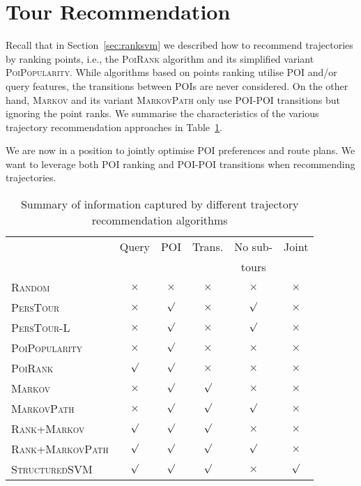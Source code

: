 \section{Tour Recommendation}
\label{sec:recommendation}


Recall that in Section~\ref{sec:ranksvm} we described how to recommend trajectories by ranking points,
i.e., the \textsc{PoiRank} algorithm and its simplified variant \textsc{PoiPopularity}.
While algorithms based on points ranking utilise POI and/or query features, 
the transitions between POIs are never considered.
On the other hand, \textsc{Markov} and its variant \textsc{MarkovPath}
only use POI-POI transitions but ignoring the point ranks.
We summarise the characteristics of the various trajectory recommendation approaches in Table~\ref{tab:algsummary}.

We are now in a position to jointly optimise POI preferences and route plans.
We want to leverage both POI ranking and POI-POI transitions when recommending trajectories.


\begin{table}[t]
\caption{Summary of information captured by different trajectory recommendation algorithms}
\label{tab:algsummary}
\centering
\setlength{\tabcolsep}{3pt} %
\begin{tabular}{l|*{5}{c}} \hline
                                & Query    & POI      & Trans.     & No sub-      & Joint    \\
                                &          &          &            & tours        &          \\ \hline
\textsc{Random}                 & $\times$ & $\times$ & $\times$   & $\times$     & $\times$ \\
\textsc{PersTour}\cite{ijcai15} & $\times$ & $\surd$  & $\times$   & $\surd$      & $\times$ \\
\textsc{PersTour-L}             & $\times$ & $\surd$  & $\times$   & $\surd$      & $\times$ \\
\textsc{PoiPopularity}          & $\times$ & $\surd$  & $\times$   & $\times$     & $\times$ \\
\textsc{PoiRank}                & $\surd$  & $\surd$  & $\times$   & $\times$     & $\times$ \\
\textsc{Markov}                 & $\times$ & $\surd$  & $\surd$    & $\times$     & $\times$ \\
\textsc{MarkovPath}             & $\times$ & $\surd$  & $\surd$    & $\surd$      & $\times$ \\
\textsc{Rank+Markov}            & $\surd$  & $\surd$  & $\surd$    & $\times$     & $\times$ \\
\textsc{Rank+MarkovPath}        & $\surd$  & $\surd$  & $\surd$    & $\surd$      & $\times$ \\
\textsc{StructuredSVM}          & $\surd$  & $\surd$  & $\surd$    & $\times$     & $\surd$  \\ \hline
\end{tabular}
\end{table}




